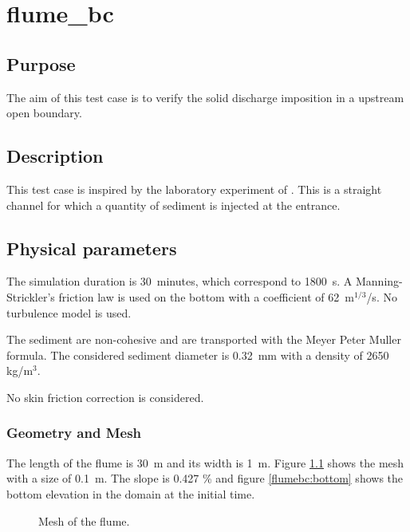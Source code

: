 \chapter{flume\_bc}
%

%
\section{Purpose}

The aim of this test case is to verify the solid discharge imposition in a
upstream open boundary.

\section{Description}

This test case is inspired by the laboratory experiment of
\cite{soni1981laboratory}. This is a straight channel for which a quantity of
sediment is injected at the entrance.

\section{Physical parameters}

The simulation duration is 30~minutes, which correspond to 1800~s.
%
A Manning-Strickler's friction law is used on the bottom with a coefficient of
62~m$^{1/3}$/s.
%
No turbulence model is used.

The sediment are non-cohesive and are transported with the Meyer Peter Muller
formula. The considered sediment diameter is 0.32~mm with a density of 2650~
kg/m$^3$.

No skin friction correction is considered.

\subsection{Geometry and Mesh}
%
The length of the flume is 30~m and its width is 1~m. Figure \ref{flumebc:mesh}
 shows the mesh with a size of 0.1~m. The slope is 0.427 \% and figure
\ref{flumebc:bottom} shows the bottom elevation in the domain at the initial
time.

\begin{figure}[H]
 \centering
 \caption{Mesh of the flume.}
 \label{flumebc:mesh}
\end{figure}

